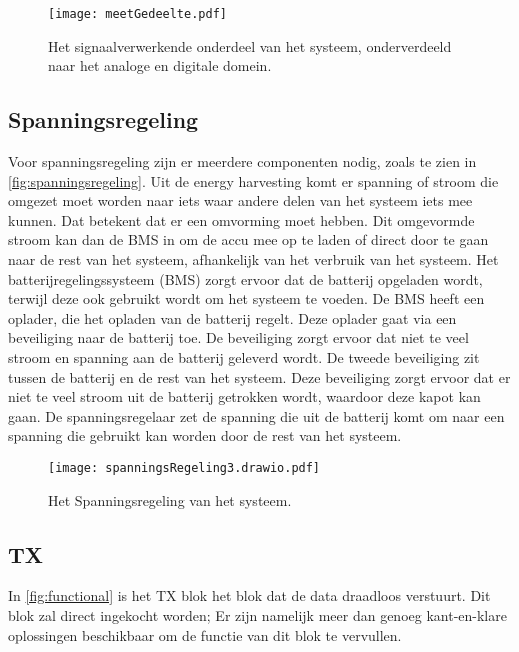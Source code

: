 \begin{figure}[ht]
    \centering
    \texttt{[image: meetGedeelte.pdf]}
    \caption{Het signaalverwerkende onderdeel van het systeem, onderverdeeld naar het analoge en digitale domein.}
    \label{fig:signaalverwerking}
\end{figure}

\subsection{Spanningsregeling}
Voor spanningsregeling zijn er meerdere componenten nodig, zoals te zien in \autoref{fig:spanningsregeling}. Uit de energy harvesting komt er spanning of stroom die omgezet moet worden naar iets waar andere delen van het systeem iets mee kunnen. Dat betekent dat er een omvorming moet hebben. Dit omgevormde stroom kan dan de BMS in om de accu mee op te laden of direct door te gaan naar de rest van het systeem, afhankelijk van het verbruik van het systeem. 
Het batterijregelingssysteem (BMS) zorgt ervoor dat de batterij opgeladen wordt, terwijl deze ook gebruikt wordt om het systeem te voeden.
De BMS heeft een oplader, die het opladen van de batterij regelt. Deze oplader gaat via een beveiliging naar de batterij toe. De beveiliging zorgt ervoor dat niet te veel stroom en spanning aan de batterij geleverd wordt. De tweede beveiliging zit tussen de batterij en de rest van het systeem. Deze beveiliging zorgt ervoor dat er niet te veel stroom uit de batterij getrokken wordt, waardoor deze kapot kan gaan. De spanningsregelaar zet de spanning die uit de batterij komt om naar een spanning die gebruikt kan worden door de rest van het systeem. 

\begin{figure}[ht]
    \centering
    \texttt{[image: spanningsRegeling3.drawio.pdf]}
    \caption{Het Spanningsregeling van het systeem.}
    \label{fig:spanningsregeling}
\end{figure}

\subsection{TX}
In \autoref{fig:functional} is het TX blok het blok dat de data draadloos verstuurt. Dit blok zal direct ingekocht worden; Er zijn namelijk meer dan genoeg kant-en-klare oplossingen beschikbaar om de functie van dit blok te vervullen.


